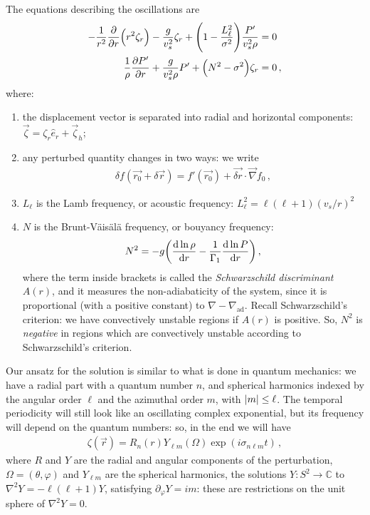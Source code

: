 \documentclass[main.tex]{subfiles}
\begin{document}
The equations describing the oscillations are 
%
\begin{align}
- \frac{1}{r^2} \pdv{}{r} \qty(r^2 \zeta_{r}) - \frac{g}{v_s^2} \zeta_{r} + \qty(1 - \frac{L_\ell^2}{\sigma^2}) \frac{P'}{v_s^2 \rho } &= 0  \\
\frac{1}{\rho } \pdv{P'}{r} + \frac{g}{v_s^2\rho } P' + \qty(N^2-\sigma^2)\zeta_{r} &=0
\,,
\end{align}
%
where: 
\begin{enumerate}
  \item the displacement vector is separated into radial and horizontal components: \(\vec{\zeta} = \zeta_{r} \hat{e}_{r} + \vec{\zeta}_{h}\); 
  \item any perturbed quantity changes in two ways: we write 
  \begin{align}
  \delta f( \vec{r_0} + \delta \vec{r}) = f' (\vec{r_0} ) + \vec{ \delta  r} \cdot \vec{\nabla} f_0 
  \,,
  \end{align}
  \item \(L_{\ell}\) is the Lamb frequency, or acoustic frequency: \(L_{\ell}^2 = \ell (\ell+1) (v_s / r)^2\)
  \item \(N\) is the Brunt-Väisälä frequency, or bouyancy frequency: 
  \begin{align}
    N^2= -g \qty(\dv{\ln \rho }{r} - \frac{1}{\Gamma_1} \dv{\ln P }{r} )
  \,,
  \end{align}
  where the term inside brackets is called the \emph{Schwarzschild discriminant} \(A(r)\), and it measures the non-adiabaticity of the system, since it is proportional (with a positive constant) to \(\nabla - \nabla_{\text{ad}}\). 
  Recall Schwarzschild's criterion: we have convectively unstable regions if \(A(r)\) is positive. So, \(N^2\) is \emph{negative} in regions which are convectively unstable according to Schwarzschild's criterion.
\end{enumerate}

Our ansatz for the solution is similar to what is done in quantum mechanics: we have a radial part with a quantum number \(n\), and spherical harmonics indexed by the angular order \(\ell \) and the azimuthal order \(m\), with \(\abs{m} \leq \ell\). The temporal periodicity will still look like an oscillating complex exponential, but its frequency will depend on the quantum numbers: so, in the end we will have 
%
\begin{align}
\zeta (\vec{r}) = R_{n} (r) Y_{\ell m} (\Omega) \exp(i \sigma_{n \ell m} t)
\,,
\end{align}
%
where \(R\) and \(Y\) are the radial and angular components of the perturbation, \(\Omega = (\theta , \varphi )\) and \(Y_{\ell m}\) are the spherical harmonics, the solutions \(Y \colon S^{2} \rightarrow \mathbb{C}\) to \(\nabla^2 Y = - \ell (\ell +1) Y \), satisfying \(\partial_{\varphi }Y = im\): these are restrictions on the unit sphere of \(\nabla^2Y = 0\). 
\end{document}
